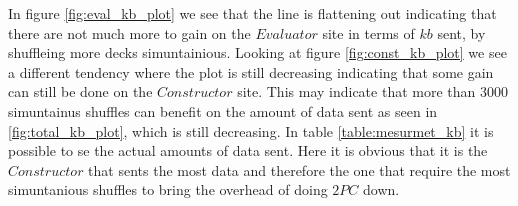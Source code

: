 \documentclass[twoside,11pt,openright]{report}
\begin{document}
In figure \ref{fig:eval_kb_plot} we see that the line is flattening out indicating that there are not much more to gain on the $Evaluator$ site in terms of $kb$ sent, by shuffleing more decks simuntainious. Looking at figure \ref{fig:const_kb_plot} we see a different tendency where the plot is still decreasing indicating that some gain can still be done on the $Constructor$ site. This may indicate that more than $3000$ simuntainus shuffles can benefit on the amount of data sent as seen in \ref{fig:total_kb_plot}, which is still decreasing. In table \ref{table:mesurmet_kb} it is possible to se the actual amounts of data sent. Here it is obvious that it is the $Constructor$ that sents the most data and therefore the one that require the most simuntanious shuffles to bring the overhead of doing $2PC$ down.

\begin{table}
\centering

    \begin{subtable}{\textwidth}
    \label{table:const_kb}
    \centering
    \caption{$Constructor$}
    \end{subtable}%
    
    \vspace*{.5cm}
    
    \begin{subtable}{\textwidth}
    \label{table:eval_kb}
    \centering
    \caption{$Evaluator$}
    \end{subtable}%


\end{table}
\end{document}
